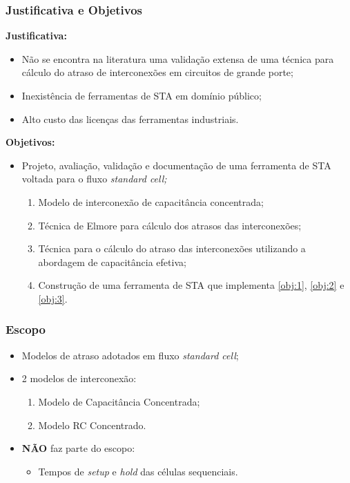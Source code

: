 \documentclass[10pt,a4paper]{beamer}
\begin{document}
			\begin{frame}[t]
				\frametitle{Justificativa e Objetivos}
				\textbf{Justificativa:}
				\begin{itemize}
					\item Não se encontra na literatura uma validação extensa de uma técnica para cálculo do atraso de interconexões em circuitos de grande porte;					
					\item Inexistência de ferramentas de STA em domínio público;
					\item Alto custo das licenças das ferramentas industriais.
					
				\end{itemize}
				\pause
				\textbf{Objetivos:}
				\begin{itemize}
					\item Projeto, avaliação, validação e documentação de uma ferramenta de STA voltada para o fluxo \textit{standard cell;}
					\begin{enumerate}
						\item Modelo de interconexão de capacitância concentrada; \label{obj:1}
						\item Técnica de Elmore para cálculo dos atrasos das interconexões; \label{obj:2}
						\item Técnica para o cálculo do atraso das interconexões utilizando a abordagem de capacitância efetiva; \label{obj:3}
						\item Construção de uma ferramenta de STA que implementa \ref{obj:1}, \ref{obj:2} e \ref{obj:3}. 
					\end{enumerate}
				\end{itemize}
			\end{frame}
		
			
			\begin{frame}[t]
				\frametitle{Escopo}
				\begin{itemize}
					\item Modelos de atraso adotados em fluxo \textit{standard cell};
					\item 2 modelos de interconexão:
						\begin{enumerate}
							\item Modelo de Capacitância Concentrada;
							\item Modelo RC Concentrado.
						\end{enumerate}
					\item \textbf{NÃO} faz parte do escopo:
					\begin{itemize}
						\item Tempos de \textit{setup} e \textit{hold} das células sequenciais.
					\end{itemize}
				\end{itemize}
				
				
			\end{frame}
		
\end{document}
